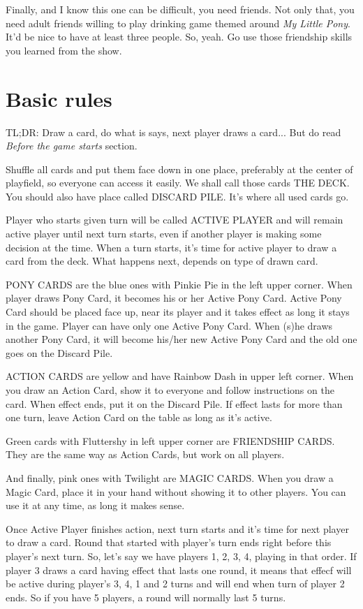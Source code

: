 \documentclass[notitlepage]{article}
\begin{document}
Finally, and I know this one can be difficult, you need friends. Not only that, you need adult friends willing to play drinking game themed around \textsl{My Little Pony}. It'd be nice to have at least three people. So, yeah. Go use those friendship skills you learned from the show.

\section{Basic rules}
TL;DR: Draw a card, do what is says, next player draws a card... But do read \textsl{Before the game starts} section.

Shuffle all cards and put them face down in one place, preferably at the center of playfield, so everyone can access it easily. We shall call those cards THE DECK. You should also have place called DISCARD PILE. It's where all used cards go.

Player who starts given turn will be called ACTIVE PLAYER and will remain active player until next turn starts, even if another player is making some decision at the time. When a turn starts, it's time for active player to draw a card from the deck. What happens next, depends on type of drawn card.

PONY CARDS are the blue ones with Pinkie Pie in the left upper corner. When player draws Pony Card, it becomes his or her Active Pony Card. Active Pony Card should be placed face up, near its player and it takes effect as long it stays in the game. Player can have only one Active Pony Card. When (s)he draws another Pony Card, it will become his/her new Active Pony Card and the old one goes on the Discard Pile.

ACTION CARDS are yellow and have Rainbow Dash in upper left corner. When you draw an Action Card, show it to everyone and follow instructions on the card. When effect ends, put it on the Discard Pile. If effect lasts for more than one turn, leave Action Card on the table as long as it's active.

Green cards with Fluttershy in left upper corner are FRIENDSHIP CARDS. They are the same way as Action Cards, but work on all players.

And finally, pink ones with Twilight are MAGIC CARDS. When you draw a Magic Card, place it in your hand without showing it to other players. You can use it at any time, as long it makes sense.

Once Active Player finishes action, next turn starts and it's time for next player to draw a card. Round that started with player's turn ends right before this player's next turn. So, let's say we have players 1, 2, 3, 4, playing in that order. If player 3 draws a card having effect that lasts one round, it means that effecf will be active during player's 3, 4, 1 and 2 turns and will end when turn of player 2 ends. So if you have 5 players, a round will normally last 5 turns.
\end{document}
